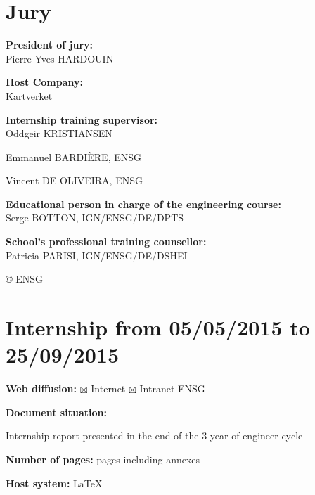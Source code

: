 \newevenpage
\thispagestyle{plain}
\section*{Jury}
\shorthandoff{:}

\vspace{0.5cm}

\textbf{President of jury:} \\

Pierre-Yves HARDOUIN

\vspace{0.5cm}

\textbf{Host Company:} \\

Kartverket

\vspace{0.5cm}

\textbf{Internship training supervisor:} \\ 

Oddgeir KRISTIANSEN \par
Emmanuel BARDIÈRE, ENSG \par
Vincent DE OLIVEIRA, ENSG

\vspace{0.5cm}

\textbf{Educational person in charge of the engineering course:} \\

Serge BOTTON, IGN/ENSG/DE/DPTS

\vspace{0.5cm}

\textbf{School's professional training counsellor:} \\

Patricia PARISI, IGN/ENSG/DE/DSHEI

\vspace{1cm}

\copyright \hspace{0.3cm} ENSG

\section*{Internship from 05/05/2015 to 25/09/2015}
\vspace{0.3cm}
\textbf{Web diffusion:} $\boxtimes$ Internet \hspace{0.2cm} $\boxtimes$ Intranet ENSG

\vspace{0.3cm}
\textbf{Document situation:} 

\vspace{0.2cm}
\par
Internship report presented in the end of the 3 year of engineer cycle

\vspace{0.3cm}
\textbf{Number of pages:}  pages including  annexes

\vspace{0.3cm}
\textbf{Host system:} \LaTeX
\vspace{1cm}
